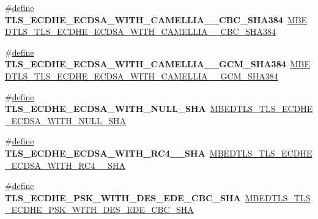 \begin{DoxyCompactItemize}
\item 
\mbox{\label{compat-1_83_8h_a4a62fb5e5c927e04100541156cbcc8a4}} 
\#\hyperlink{structdefine}{define} {\bfseries T\+L\+S\+\_\+\+E\+C\+D\+H\+E\+\_\+\+E\+C\+D\+S\+A\+\_\+\+W\+I\+T\+H\+\_\+\+C\+A\+M\+E\+L\+L\+I\+A\+\_\+\_\+\+C\+B\+C\+\_\+\+S\+H\+A384}~\hyperlink{ssl__ciphersuites_8h_af9f6960455884d1403eebc12c12a5723}{M\+B\+E\+D\+T\+L\+S\+\_\+\+T\+L\+S\+\_\+\+E\+C\+D\+H\+E\+\_\+\+E\+C\+D\+S\+A\+\_\+\+W\+I\+T\+H\+\_\+\+C\+A\+M\+E\+L\+L\+I\+A\+\_\+\_\+\+C\+B\+C\+\_\+\+S\+H\+A384}
\item 
\mbox{\label{compat-1_83_8h_a3b62aaa22dac436ed4900ae8a4b951e3}} 
\#\hyperlink{structdefine}{define} {\bfseries T\+L\+S\+\_\+\+E\+C\+D\+H\+E\+\_\+\+E\+C\+D\+S\+A\+\_\+\+W\+I\+T\+H\+\_\+\+C\+A\+M\+E\+L\+L\+I\+A\+\_\+\_\+\+G\+C\+M\+\_\+\+S\+H\+A384}~\hyperlink{ssl__ciphersuites_8h_af4a21bbea6146cc416ad7eb3a9a98b98}{M\+B\+E\+D\+T\+L\+S\+\_\+\+T\+L\+S\+\_\+\+E\+C\+D\+H\+E\+\_\+\+E\+C\+D\+S\+A\+\_\+\+W\+I\+T\+H\+\_\+\+C\+A\+M\+E\+L\+L\+I\+A\+\_\+\_\+\+G\+C\+M\+\_\+\+S\+H\+A384}
\item 
\mbox{\label{compat-1_83_8h_a91a8463281be48d23d8228562fb1cd83}} 
\#\hyperlink{structdefine}{define} {\bfseries T\+L\+S\+\_\+\+E\+C\+D\+H\+E\+\_\+\+E\+C\+D\+S\+A\+\_\+\+W\+I\+T\+H\+\_\+\+N\+U\+L\+L\+\_\+\+S\+HA}~\hyperlink{ssl__ciphersuites_8h_a74a8cea63eb3259bbd89750742d43d10}{M\+B\+E\+D\+T\+L\+S\+\_\+\+T\+L\+S\+\_\+\+E\+C\+D\+H\+E\+\_\+\+E\+C\+D\+S\+A\+\_\+\+W\+I\+T\+H\+\_\+\+N\+U\+L\+L\+\_\+\+S\+HA}
\item 
\mbox{\label{compat-1_83_8h_afad7747f5ea2c8b5f8cad720e58245c1}} 
\#\hyperlink{structdefine}{define} {\bfseries T\+L\+S\+\_\+\+E\+C\+D\+H\+E\+\_\+\+E\+C\+D\+S\+A\+\_\+\+W\+I\+T\+H\+\_\+\+R\+C4\+\_\+\_\+\+S\+HA}~\hyperlink{ssl__ciphersuites_8h_af4f043bc84867aee990ec507af89bb32}{M\+B\+E\+D\+T\+L\+S\+\_\+\+T\+L\+S\+\_\+\+E\+C\+D\+H\+E\+\_\+\+E\+C\+D\+S\+A\+\_\+\+W\+I\+T\+H\+\_\+\+R\+C4\+\_\+\_\+\+S\+HA}
\item 
\mbox{\label{compat-1_83_8h_a0c18bbcf880ea34838112d753fa1a8ad}} 
\#\hyperlink{structdefine}{define} {\bfseries T\+L\+S\+\_\+\+E\+C\+D\+H\+E\+\_\+\+P\+S\+K\+\_\+\+W\+I\+T\+H\+\_\+D\+E\+S\+\_\+\+E\+D\+E\+\_\+\+C\+B\+C\+\_\+\+S\+HA}~\hyperlink{ssl__ciphersuites_8h_ab07c4acb23fbd7abbfd1e28b7b015453}{M\+B\+E\+D\+T\+L\+S\+\_\+\+T\+L\+S\+\_\+\+E\+C\+D\+H\+E\+\_\+\+P\+S\+K\+\_\+\+W\+I\+T\+H\+\_\+D\+E\+S\+\_\+\+E\+D\+E\+\_\+\+C\+B\+C\+\_\+\+S\+HA}

\end{DoxyCompactItemize}
